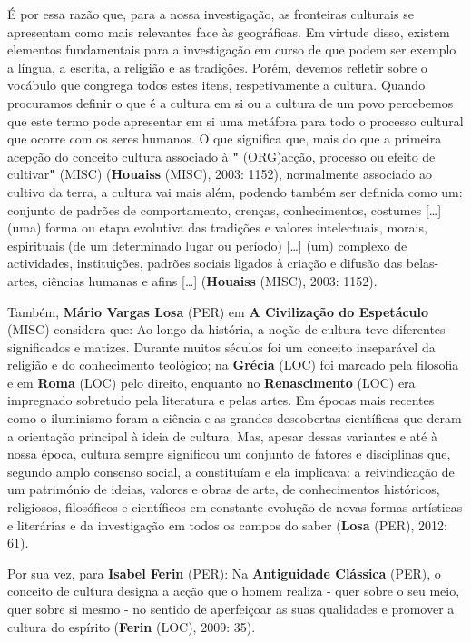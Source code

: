 \documentclass[12pt,a4paper]{article}
\begin{document}
É  por  essa  razão  que,  para  a  nossa  investigação,  as  fronteiras  culturais  se  apresentam como  mais  relevantes  face  às  geográficas.  Em  virtude  disso,  existem  elementos fundamentais para a investigação em curso de que podem ser exemplo a língua, a escrita, a religião e as tradições. Porém, devemos refletir sobre o vocábulo que congrega todos estes itens, respetivamente a cultura. Quando procuramos definir o que é a cultura em si ou a cultura de um povo percebemos que este termo pode apresentar em si uma metáfora para todo o processo cultural que ocorre com os seres humanos. O que significa que, mais do que a primeira acepção do conceito cultura associado à \textbf{"} (ORG)acção, processo ou efeito de cultivar\textbf{"} (MISC) (\textbf{Houaiss} (MISC), 2003: 1152), normalmente associado ao cultivo da terra, a cultura vai mais além, podendo também ser definida como um: conjunto  de  padrões  de comportamento, crenças,  conhecimentos,  costumes  […]  (uma) forma ou etapa evolutiva das tradições e valores intelectuais, morais, espirituais (de um determinado lugar ou período) […] (um) complexo de actividades, instituições, padrões sociais ligados à criação e difusão das belas-artes, ciências humanas e afins […] (\textbf{Houaiss} (MISC), 2003: 1152).

Também, \textbf{Mário Vargas Losa} (PER) em \textbf{A Civilização do Espetáculo} (MISC) considera que: Ao longo da história, a noção de cultura teve diferentes significados e matizes. Durante muitos séculos foi um conceito inseparável da religião e do conhecimento teológico; na \textbf{Grécia} (LOC) foi marcado pela filosofia e em \textbf{Roma} (LOC) pelo direito, enquanto no \textbf{Renascimento} (LOC) era impregnado  sobretudo  pela  literatura  e  pelas  artes.  Em  épocas  mais  recentes  como  o iluminismo foram a ciência e as grandes descobertas científicas que deram a orientação principal  à  ideia  de  cultura.  Mas,  apesar  dessas  variantes  e  até  à  nossa  época,  cultura sempre  significou  um  conjunto  de  fatores  e  disciplinas  que,  segundo  amplo  consenso social, a constituíam e ela implicava: a reivindicação de um património de ideias, valores e  obras  de  arte,  de  conhecimentos  históricos,  religiosos,  filosóficos  e  científicos  em constante evolução de novas formas artísticas e literárias e da investigação em todos os campos do saber (\textbf{Losa} (PER), 2012: 61).

Por sua vez, para \textbf{Isabel Ferin} (PER): Na \textbf{Antiguidade Clássica} (PER), o conceito de cultura designa a acção que o homem realiza  - quer sobre o seu meio, quer sobre si mesmo - no sentido de aperfeiçoar as suas qualidades e promover a cultura do espírito (\textbf{Ferin} (LOC), 2009: 35).
\end{document}
